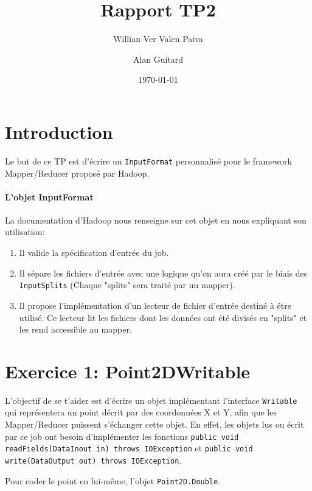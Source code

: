 \documentclass[a4paper]{article}
\author{Willian Ver Valen Paiva \and Alan Guitard}
\date{\today}
\title{Rapport TP2}
\begin{document}
\maketitle

\tableofcontents

\newpage

\section{Introduction}
Le but de ce TP est d'écrire un \verb?InputFormat? personnalisé pour le framework Mapper/Reducer proposé par Hadoop.

\paragraph{L'objet InputFormat}
La documentation d'Hadoop nous renseigne sur cet objet en nous expliquant son utilisation:
\begin{enumerate}
\item Il valide la spécification d'entrée du job.
\item Il sépare les fichiers d'entrée avec une logique qu'on aura créé par le biais des \verb?InputSplits? (Chaque "splits" sera traité par un mapper).
\item Il propose l'implémentation d'un lecteur de fichier d'entrée destiné à être utilisé. Ce lecteur lit les fichiers dont les données ont été divisés en "splits" et les rend accessible au mapper.
\end{enumerate}

\section{Exercice 1: Point2DWritable}

L'objectif de se t'aider est d'écrire un objet implémentant l'interface \verb?Writable? qui représentera un point décrit par des coordonnées X et Y, afin que les Mapper/Reducer puissent s'échanger cette objet. En effet, les objets lus ou écrit par ce job ont besoin d'implémenter les fonctions \newline  \verb?public void readFields(DataInout in) throws IOException? et \newline \verb?public void write(DataOutput out) throws IOException?.

Pour coder le point en lui-même, l'objet \verb?Point2D.Double?.
\end{document}
